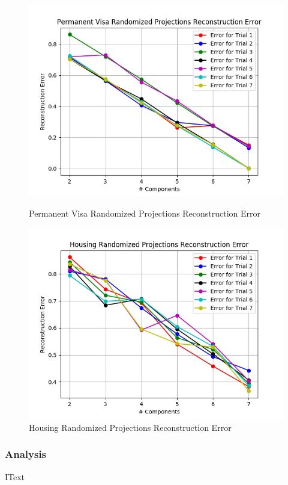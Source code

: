 \documentclass[h]{article}
\begin{document}
 \begin{figure}[H]
      \includegraphics[width=1\textwidth,keepaspectratio]{permanent_visa_randomized_projections_reconstruction_error.jpg} 
      \caption*{Permanent Visa Randomized Projections Reconstruction Error } 
   \endminipage\hfill
      \includegraphics[width=1\textwidth,keepaspectratio]{housing_randomized_projections_reconstruction_error.jpg} 
      \caption*{Housing Randomized Projections Reconstruction Error} 
   \endminipage\hfill
\end{figure}

\subsubsection*{Analysis}
IText
\end{document}
